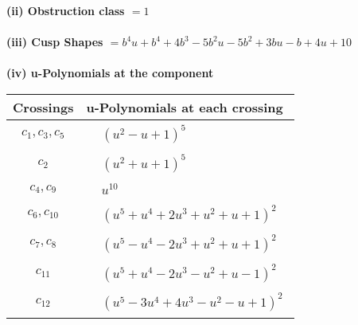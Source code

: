 \documentclass[1p]{elsarticle_modified}
\theoremstyle{definition}
\begin{document}
\flushleft \textbf{(ii) Obstruction class $= 1$}\\~\\
\flushleft \textbf{(iii) Cusp Shapes $= b^4 u+b^4+4 b^3-5 b^2 u-5 b^2+3 b u- b+4 u+10$}\\~\\
\newpage\renewcommand{\arraystretch}{1}
\flushleft \textbf{(iv) u-Polynomials at the component}\newline \\
\begin{tabular}{m{50pt}|m{274pt}}
Crossings & \hspace{64pt}u-Polynomials at each crossing \\
\hline $$\begin{aligned}c_{1},c_{3},c_{5}\end{aligned}$$&$\begin{aligned}
&(u^2- u+1)^5
\end{aligned}$\\
\hline $$\begin{aligned}c_{2}\end{aligned}$$&$\begin{aligned}
&(u^2+u+1)^5
\end{aligned}$\\
\hline $$\begin{aligned}c_{4},c_{9}\end{aligned}$$&$\begin{aligned}
&u^{10}
\end{aligned}$\\
\hline $$\begin{aligned}c_{6},c_{10}\end{aligned}$$&$\begin{aligned}
&(u^5+u^4+2 u^3+u^2+u+1)^2
\end{aligned}$\\
\hline $$\begin{aligned}c_{7},c_{8}\end{aligned}$$&$\begin{aligned}
&(u^5- u^4-2 u^3+u^2+u+1)^2
\end{aligned}$\\
\hline $$\begin{aligned}c_{11}\end{aligned}$$&$\begin{aligned}
&(u^5+u^4-2 u^3- u^2+u-1)^2
\end{aligned}$\\
\hline $$\begin{aligned}c_{12}\end{aligned}$$&$\begin{aligned}
&(u^5-3 u^4+4 u^3- u^2- u+1)^2
\end{aligned}$\\
\hline
\end{tabular}\\~\\
\end{document}
